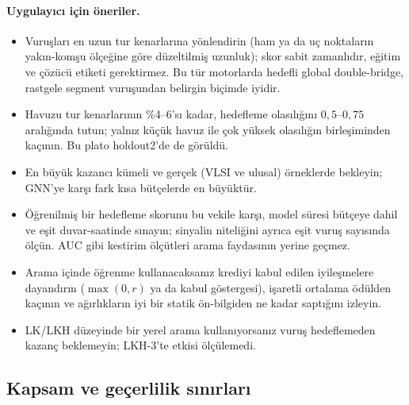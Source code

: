 \paragraph{Uygulayıcı için öneriler.}
\begin{itemize}
\item Vuruşları en uzun tur kenarlarına yönlendirin (ham ya da uç noktaların yakın-komşu ölçeğine
göre düzeltilmiş uzunluk); skor sabit zamanlıdır, eğitim ve çözücü etiketi gerektirmez. Bu tür
motorlarda hedefli global double-bridge, rastgele segment vuruşundan belirgin biçimde iyidir.
\item Havuzu tur kenarlarının \%4--6'sı kadar, hedefleme olasılığını $0{,}5$--$0{,}75$ aralığında
tutun; yalnız küçük havuz ile çok yüksek olasılığın birleşiminden kaçının. Bu plato holdout2'de de
görüldü.
\item En büyük kazancı kümeli ve gerçek (VLSI ve ulusal) örneklerde bekleyin; GNN'ye karşı fark
kısa bütçelerde en büyüktür.
\item Öğrenilmiş bir hedefleme skorunu bu vekile karşı, model süresi bütçeye dahil ve eşit
duvar-saatinde sınayın; sinyalin niteliğini ayrıca eşit vuruş sayısında ölçün. AUC gibi kestirim
ölçütleri arama faydasının yerine geçmez.
\item Arama içinde öğrenme kullanacaksanız krediyi kabul edilen iyileşmelere dayandırın
($\max(0,r)$ ya da kabul göstergesi), işaretli ortalama ödülden kaçının ve ağırlıkların iyi bir
statik ön-bilgiden ne kadar saptığını izleyin.
\item LK/LKH düzeyinde bir yerel arama kullanıyorsanız vuruş hedeflemeden kazanç beklemeyin; LKH-3'te
etkisi ölçülemedi.
\end{itemize}

\subsection{Kapsam ve geçerlilik sınırları}\label{sec:tartisma-sinir}

